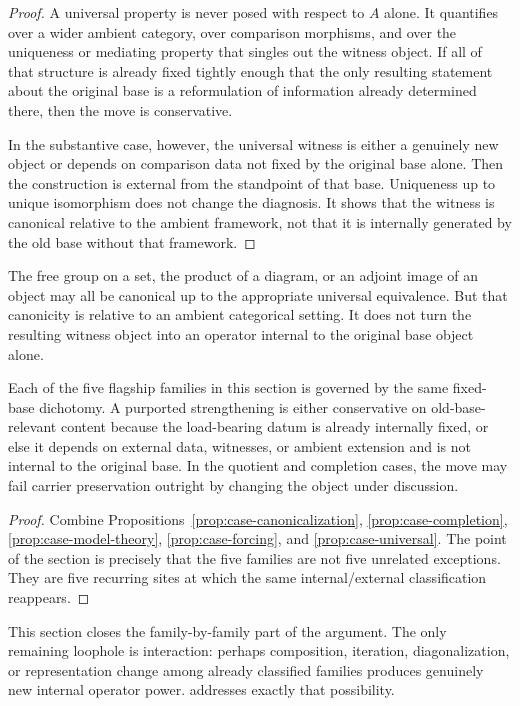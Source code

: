 \begin{proof}
A universal property is never posed with respect to $A$ alone. It quantifies over a wider ambient category, over comparison morphisms, and over the uniqueness or mediating property that singles out the witness object. If all of that structure is already fixed tightly enough that the only resulting statement about the original base is a reformulation of information already determined there, then the move is conservative.

In the substantive case, however, the universal witness is either a genuinely new object or depends on comparison data not fixed by the original base alone. Then the construction is external from the standpoint of that base. Uniqueness up to unique isomorphism does not change the diagnosis. It shows that the witness is canonical relative to the ambient framework, not that it is internally generated by the old base without that framework.
\end{proof}

\begin{example}
The free group on a set, the product of a diagram, or an adjoint image of an object may all be canonical up to the appropriate universal equivalence. But that canonicity is relative to an ambient categorical setting. It does not turn the resulting witness object into an operator internal to the original base object alone.
\end{example}

\begin{theorem}\label{thm:case-study-closure}
Each of the five flagship families in this section is governed by the same fixed-base dichotomy. A purported strengthening is either conservative on old-base-relevant content because the load-bearing datum is already internally fixed, or else it depends on external data, witnesses, or ambient extension and is not internal to the original base. In the quotient and completion cases, the move may fail carrier preservation outright by changing the object under discussion.
\end{theorem}

\begin{proof}
Combine Propositions~\ref{prop:case-canonicalization}, \ref{prop:case-completion}, \ref{prop:case-model-theory}, \ref{prop:case-forcing}, and \ref{prop:case-universal}. The point of the section is precisely that the five families are not five unrelated exceptions. They are five recurring sites at which the same internal/external classification reappears.
\end{proof}

\begin{remark}
This section closes the family-by-family part of the argument. The only remaining loophole is interaction: perhaps composition, iteration, diagonalization, or representation change among already classified families produces genuinely new internal operator power.  addresses exactly that possibility.
\end{remark}
